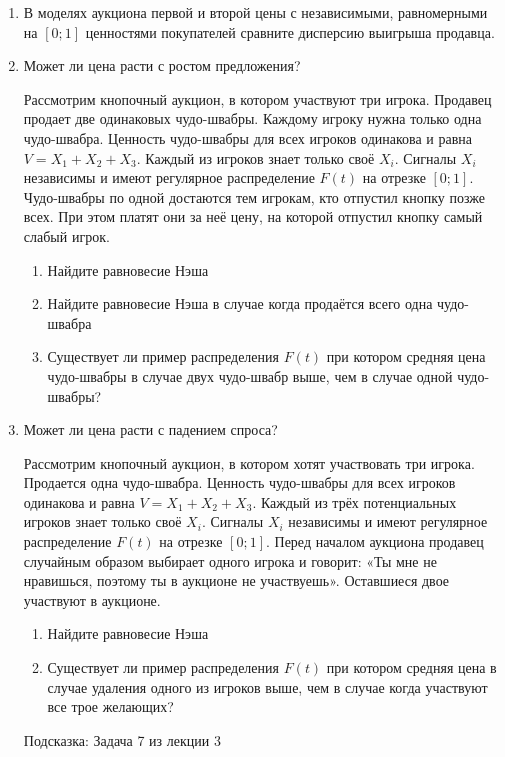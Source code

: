 \begin{enumerate}
\item В моделях аукциона первой и второй цены с независимыми, равномерными на $ [0;1] $ ценностями покупателей сравните дисперсию выигрыша продавца.


\item Может ли цена расти с ростом предложения?

Рассмотрим кнопочный аукцион, в котором участвуют три игрока. Продавец продает две одинаковых чудо-швабры. Каждому игроку нужна только одна чудо-швабра. Ценность чудо-швабры для всех игроков одинакова и равна $ V=X_{1}+X_{2}+X_{3} $. Каждый из игроков знает только своё $ X_{i} $. Сигналы $ X_{i} $ независимы и имеют регулярное распределение $ F(t) $ на отрезке $ [0;1] $. Чудо-швабры по одной достаются тем игрокам, кто отпустил кнопку позже всех. При этом платят они за неё цену, на которой отпустил кнопку самый слабый игрок.

\begin{enumerate}
\item Найдите равновесие Нэша
\item Найдите равновесие Нэша в случае когда продаётся всего одна чудо-швабра
\item Существует ли пример распределения $ F(t) $ при котором средняя цена чудо-швабры в  случае двух чудо-швабр выше, чем в случае одной чудо-швабры?
\end{enumerate}



\item Может ли цена расти с падением спроса?

Рассмотрим кнопочный аукцион, в котором хотят участвовать три игрока. Продается одна чудо-швабра. Ценность чудо-швабры для всех игроков одинакова и равна $ V=X_{1}+X_{2}+X_{3} $. Каждый из трёх потенциальных игроков знает только своё $ X_{i} $. Сигналы $ X_{i} $ независимы и имеют регулярное распределение $ F(t) $ на отрезке $ [0;1] $. Перед началом аукциона продавец случайным образом выбирает одного игрока и говорит: «Ты мне не нравишься, поэтому ты в аукционе не участвуешь». Оставшиеся двое участвуют в аукционе.

\begin{enumerate}
\item Найдите равновесие Нэша
\item Существует ли пример распределения $ F(t) $ при котором средняя цена в случае удаления одного из игроков выше, чем в случае когда участвуют все трое желающих?
\end{enumerate}

Подсказка: Задача 7 из лекции 3




\end{enumerate}
